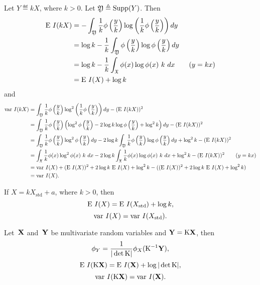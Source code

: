 \documentclass[10pt,a4paper]{article}
\theoremstyle{plain} \newtheorem{Lem}{Lemma}
\begin{document}
Let $Y \eqdef k X$, where $k > 0$.
Let $\mathfrak Y \triangleq \mathrm {Supp}(Y)$.
Then
\begin{equation}
\begin{split}
\mathrm E \  I(kX) &= - \int_{\mathfrak Y} \frac 1 k \phi\left(\frac y k\right) \log \left(\frac 1 k \phi\left(\frac y k\right)\right) dy  \\
      &= \log k - \frac 1 k \int_{\mathfrak Y} \phi\left(\frac y k\right) \log \phi\left(\frac y k\right) dy \\
      &= \log k - \frac 1 k \int_{\mathfrak X} \phi (x) \log \phi (x) \ k \ dx  \qquad (y = kx) \\
      &= \mathrm E \  I(X) + \log k 
\end{split}
\end{equation}
and
\begin{equation}
\begin{split}
\mathrm {var} \  I(kX) &= \int_{\mathfrak Y} {\frac 1 k} \phi\left({\frac y k}\right) \log^2 \left({\frac 1 k} \phi\left({\frac y k}\right)\right) dy 
              - (\mathrm E \  I(kX))^2 \\
  &= \int_{\mathfrak Y} {\frac 1 k} \phi\left({\frac y k}\right) \left( \log^2 \phi\left({\frac y k}\right) - 2 \log k \log \phi \left({\frac y k}\right) + \log^2 k \right) dy 
    - (\mathrm E \  I(kX))^2 \\
  &= \int_{\mathfrak Y} {\frac 1 k} \phi\left({\frac y k}\right) \log^2 \phi\left({\frac y k}\right) dy 
     - 2 \log k \int_{\mathfrak Y} {\frac 1 k} \phi\left({\frac y k}\right) \log \phi \left({\frac y k}\right) dy
     + \log^2 k 
     - (\mathrm E \  I(kX))^2  \\
  &= \int_{\mathfrak X} {\frac 1 k} \phi (x) \log^2 \phi(x) \ k \ dx 
     - 2 \log k \int_{\mathfrak X} {\frac 1 k} \phi(x) \log \phi (x) \ k \ dx
     + \log^2 k 
     - (\mathrm E \  I(kX))^2  \qquad (y = kx) \\
  &= \mathrm {var} \  I(X) + (\mathrm E \  I(X))^2
     + 2 \log k \ \mathrm E \  I(X)
     + \log^2 k 
     - ((\mathrm E \  I(X))^2 + 2 \log k \ \mathrm E \  I(X) + \log^2 k)  \\
  &= \mathrm {var} \  I(X).
\end{split}
\end{equation}

If $X = k X_{\mathrm {std}} + a$, where $k > 0$,
then
$$\mathrm E \  I(X) = \mathrm E \  I(X_{\mathrm {std}}) + \log k, $$
$$\mathrm {var} \  I(X) = \mathrm {var} \  I(X_{\mathrm {std}}).$$ 

Let~$\mathbf X$ and~$\mathbf Y$ be multivariate random variables and $\mathbf Y = \mathrm K \mathbf X$,
then $$ \phi_Y = \frac 1 {|\det \mathrm K|} \phi_X (\mathrm K^{-1} \mathbf Y), $$
$$ \mathrm E \  I(\mathrm K \mathbf X) = \mathrm E \  I(\mathbf X) + \log |\det \mathrm K|, $$
$$ \mathrm {var} \  I(\mathrm K \mathbf X) = \mathrm {var} \  I(\mathbf X). $$
\end{document}
